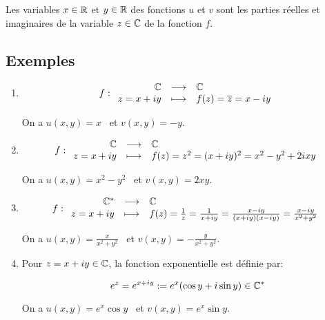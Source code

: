 \begin{remark}
    Les variables $x \in \mathbb{R}$ et $y \in \mathbb{R}$ des fonctions $u$ et $v$ sont les parties réelles et imaginaires de la variable $z \in \mathbb{C}$ de la fonction $f$.
\end{remark}

\subsection{Exemples}

\begin{example}\hfill
\begin{enumerate}[label=\arabic{enumi})]
    \item 
    \[
    f: \begin{array}{{rcl}}
    \C & \longrightarrow & \C \\
    z = x+iy & \longmapsto & f(z) = \conj{z} = x - iy \\
    \end{array}
    \]
    
    On a $u(x,y) = x \enspace$ et $v(x,y)=-y$.
    
    \item 
    \[
    f: \begin{array}{{rcl}}
    \C & \longrightarrow & \C \\
    z = x+iy & \longmapsto & f(z) = z^2 = (x + iy)^2 = x^2 - y^2 + 2ixy \\
    \end{array}
    \]
    
    On a $u(x,y) = x^2 - y^2 \enspace$ et $v(x,y)= 2xy$.
    
    \item 
    \[
    f: \begin{array}{{rcl}}
    \C^* & \longrightarrow & \C \\
    z = x+iy & \longmapsto & f(z) = \frac{1}{z}
    = \frac{1}{x + iy}
    = \frac{x - iy}{(x + iy)(x - iy)}
    = \frac{x - iy}{x^2 + y^2} \\
    \end{array}
    \]
    
    On a $u(x,y) = \frac{x}{x^2 + y^2} \enspace$ et $v(x,y)= -\frac{y}{x^2 + y^2}$.
    
    \item 
    Pour $z = x + iy \in \mathbb{C}$, la fonction exponentielle est définie par:
    
    \[e^z = e^{x + iy} := e^x(\cos y + i \sin y) \in \mathbb{C}^*\]
    
    On a $u(x,y) = e^x \cos y \enspace$ et $v(x,y)= e^x \sin y$.
    

\end{enumerate}
\end{example}
